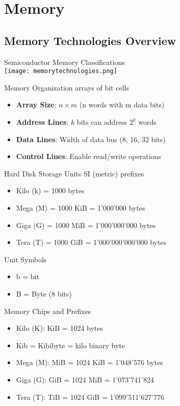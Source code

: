 \section{Memory}

\subsection{Memory Technologies Overview}

\begin{definition}{Semiconductor Memory Classifications}\\
\texttt{[image: memorytechnologies.png]}
\end{definition}

\begin{concept}{Memory Organization} arrays of bit cells
\begin{itemize}
    \item \textbf{Array Size}: $n \times m$ (n words with m data bits)
    \item \textbf{Address Lines}: $k$ bits can address $2^k$ words
    \item \textbf{Data Lines}: Width of data bus (8, 16, 32 bits)
    \item \textbf{Control Lines}: Enable read/write operations
\end{itemize}
\end{concept}

\begin{corollary}{Hard Disk Storage Units} SI (metric) prefixes
    \begin{itemize}
        \item Kilo (k) = 1000 bytes
        \item Mega (M) = 1000 KiB = 1'000'000 bytes
        \item Giga (G) = 1000 MiB = 1'000'000'000 bytes
        \item Tera (T) = 1000 GiB = 1'000'000'000'000 bytes
    \end{itemize}
\end{corollary}

\begin{theorem}{Unit Symbols}
    \begin{itemize}
        \item b = bit
        \item B = Byte (8 bits)
    \end{itemize}
\end{theorem}

\begin{corollary}{Memory Chips and Prefixes}
    \begin{itemize}
        \item Kilo (K): KiB = 1024 bytes 
        \item Kib = Kibibyte = kilo binary byte
        \item Mega (M): MiB = 1024 KiB = 1'048'576 bytes
        \item Giga (G): GiB = 1024 MiB = 1'073'741'824 
        \item Tera (T): TiB = 1024 GiB = 1'099'511'627'776 
    \end{itemize}
\end{corollary}

